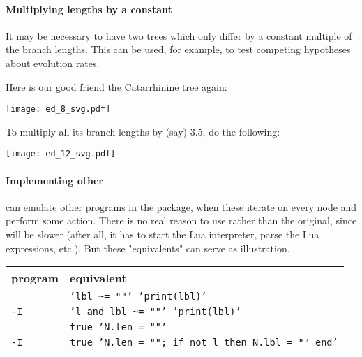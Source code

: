 
\begin{samepage}

\end{samepage}

\begin{samepage}
\paragraph{Multiplying lengths by a constant}

It may be necessary to have two trees which only differ by a constant multiple
of the branch lengths. This can be used, for example, to test competing
hypotheses about evolution rates.
\end{samepage}
Here is our good friend the Catarrhinine tree again:


\begin{center}
\texttt{[image: ed\_8\_svg.pdf]}
\end{center}

To multiply all its branch lengths by (say) 3.5, do the following:


\begin{center}
\texttt{[image: ed\_12\_svg.pdf]}
\end{center}

\paragraph{Implementing other \nutils}

\noindent{}\luaed{} can emulate other programs in the package, when these
iterate on every node and perform some action. There is no real reason to use
\luaed{} rather than the original, since \luaed{} will be slower (after all, it
has to start the Lua interpreter, parse the Lua expressions, etc.). But these
"equivalents" can serve as illustration.

\begin{center}
\begin{tabular}{ll}
program & \luaed{} equivalent \\
\hline
{}{} 						& {\tt 'lbl \~{}= ""' 'print(lbl)'}  \\
{} {\tt -I} 		& {\tt 'l and lbl \~{}= ""' 'print(lbl)'} \\
\topology{}						& {\tt true 'N.len = ""'} \\
\topology{} {\tt -I} 	& {\tt true 'N.len = ""; if not l then N.lbl = "" end'}
\end{tabular}
\end{center}

